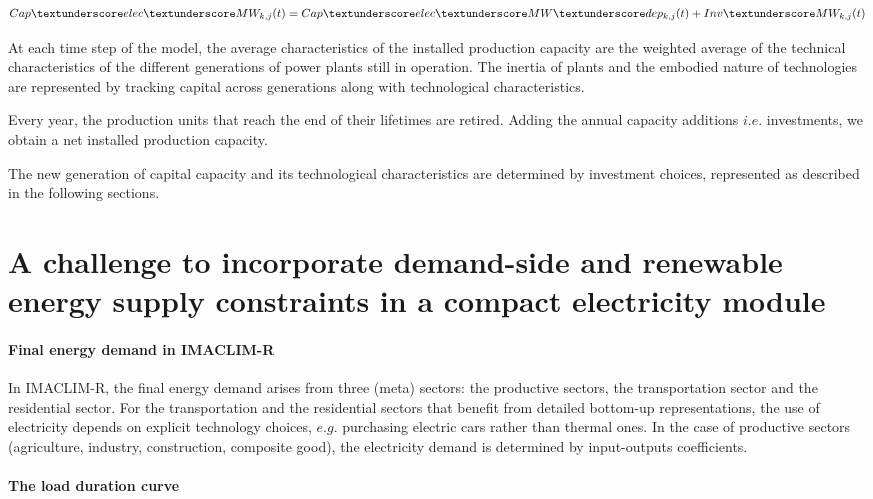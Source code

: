 \begin{dmath}
    Cap\textunderscore elec \textunderscore MW_{k,j}(t) = Cap\textunderscore elec\textunderscore MW\textunderscore dep_{k,j}(t) + Inv\textunderscore MW_{k,j}(t)
    \label{eqn:Cap_elec}
\end{dmath}





At each time step of the model, the average characteristics of the installed production capacity are the weighted average of the technical characteristics of the different generations of power plants still in operation.
The inertia of plants and the embodied nature of technologies are represented by tracking capital across generations along with technological characteristics.


Every year, the production units that reach the end of their lifetimes are retired.
Adding the annual capacity additions $i.e.$ investments, we obtain a net installed production capacity.

The new generation of capital capacity and its technological characteristics are determined by investment choices, represented as described in the following sections.


\section{A challenge to incorporate demand-side and renewable energy supply constraints in a compact electricity module}

\paragraph{Final energy demand in IMACLIM-R}
In IMACLIM-R, the final energy demand arises from three (meta) sectors: the productive sectors, the transportation sector and the residential sector. For the transportation and the residential sectors that benefit from detailed bottom-up representations, the use of electricity depends on explicit technology choices, $e.g.$ purchasing electric cars rather than thermal ones. In the case of productive sectors (agriculture, industry, construction, composite good), the electricity demand is determined by input-outputs coefficients.

\paragraph{The load duration curve}


